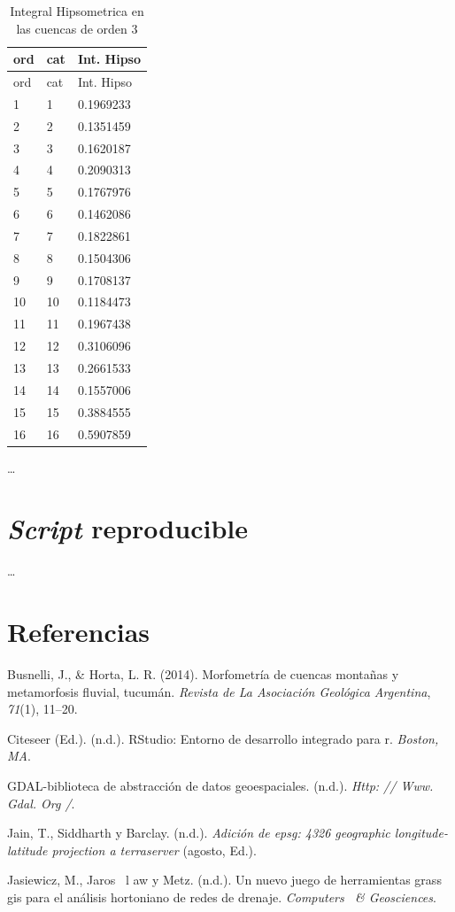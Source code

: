 \documentclass[11pt,]{article}
\begin{document}
\begin{longtable}[]{@{}lll@{}}
\caption{\label{tablanueve}Integral Hipsometrica en las cuencas de orden
3}\tabularnewline
\toprule
ord & cat & Int. Hipso\tabularnewline
\midrule
\endfirsthead
\toprule
ord & cat & Int. Hipso\tabularnewline
\midrule
\endhead
1 & 1 & 0.1969233\tabularnewline
2 & 2 & 0.1351459\tabularnewline
3 & 3 & 0.1620187\tabularnewline
4 & 4 & 0.2090313\tabularnewline
5 & 5 & 0.1767976\tabularnewline
6 & 6 & 0.1462086\tabularnewline
7 & 7 & 0.1822861\tabularnewline
8 & 8 & 0.1504306\tabularnewline
9 & 9 & 0.1708137\tabularnewline
10 & 10 & 0.1184473\tabularnewline
11 & 11 & 0.1967438\tabularnewline
12 & 12 & 0.3106096\tabularnewline
13 & 13 & 0.2661533\tabularnewline
14 & 14 & 0.1557006\tabularnewline
15 & 15 & 0.3884555\tabularnewline
16 & 16 & 0.5907859\tabularnewline
\bottomrule
\end{longtable}

\ldots

\section{\texorpdfstring{\emph{Script}
reproducible}{Script reproducible}}\label{script-reproducible}

\ldots

\section*{Referencias}\label{referencias}

\hypertarget{refs}{}
\hypertarget{ref-busnelli2014morfometria}{}
Busnelli, J., \& Horta, L. R. (2014). Morfometría de cuencas montañas y
metamorfosis fluvial, tucumán. \emph{Revista de La Asociación Geológica
Argentina}, \emph{71}(1), 11--20.

\hypertarget{ref-allaire2012rstudio}{}
Citeseer (Ed.). (n.d.). RStudio: Entorno de desarrollo integrado para r.
\emph{Boston, MA}.

\hypertarget{ref-warmerdam2005gdal}{}
GDAL-biblioteca de abstracción de datos geoespaciales. (n.d.).
\emph{Http: // Www. Gdal. Org /}.

\hypertarget{ref-jain2003adding}{}
Jain, T., Siddharth y Barclay. (n.d.). \emph{Adición de epsg: 4326
geographic longitude-latitude projection a terraserver} (agosto, Ed.).

\hypertarget{ref-jasiewicz2011new}{}
Jasiewicz, M., Jaros ~l aw y Metz. (n.d.). Un nuevo juego de
herramientas grass gis para el análisis hortoniano de redes de drenaje.
\emph{Computers ~\& Geosciences}.
\end{document}
